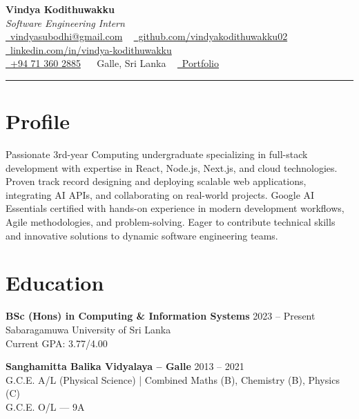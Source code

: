 \documentclass[letterpaper,10pt]{article}
\begin{document}
\begin{center}
{\Huge\color{accentTitle}\textbf{Vindya Kodithuwakku}}\\[3pt]
{\large\textit{Software Engineering Intern}}\\[4pt]
\href{mailto:vindyasubodhi@gmail.com}{\faEnvelope~vindyasubodhi@gmail.com} ~
\href{https://github.com/vindyakodithuwakku02}{\faGithub~github.com/vindyakodithuwakku02} ~
\href{https://www.linkedin.com/in/vindya-kodithuwakku-bb6187202}{\faLinkedin~linkedin.com/in/vindya-kodithuwakku}\\[2pt]
\href{tel:+94713602885}{\faPhone~+94 71 360 2885} ~
\faMapMarker*~Galle, Sri Lanka ~
\href{https://vindyakodithuwakku02.github.io/my_portfolio/}{\faGlobe~Portfolio}\\[4pt]
{\color{accentLine}\hrule}
\end{center}

\section{Profile}
\vspace{-1pt}
\justifying
Passionate 3rd-year Computing undergraduate specializing in full-stack development with expertise in React, Node.js, Next.js, and cloud technologies. Proven track record designing and deploying scalable web applications, integrating AI APIs, and collaborating on real-world projects. Google AI Essentials certified with hands-on experience in modern development workflows, Agile methodologies, and problem-solving. Eager to contribute technical skills and innovative solutions to dynamic software engineering teams.

\section{Education}
\vspace{-1pt}

\noindent\textbf{BSc (Hons) in Computing \& Information Systems} \hfill 2023 – Present\\
\noindent Sabaragamuwa University of Sri Lanka\\
\noindent Current GPA: 3.77/4.00

\vspace{2pt}
\noindent\textbf{Sanghamitta Balika Vidyalaya – Galle} \hfill 2013 – 2021\\
\noindent G.C.E. A/L (Physical Science) | Combined Maths (B), Chemistry (B), Physics (C)\\
\noindent G.C.E. O/L — 9A
\end{document}
